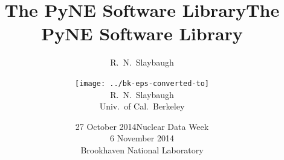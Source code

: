 \documentclass[xcolor=x11names,compress]{beamer}
\title{The PyNE Software Library}
\author{R.\ N.\ Slaybaugh}
\date{27 October 2014}
\renewcommand{\(}{\begin{columns}}
\renewcommand{\)}{\end{columns}}
\newcommand{\<}[1]{\begin{column}{#1}}
\renewcommand{\>}{\end{column}}
\begin{document}
\begin{frame}
\title{The PyNE Software Library}
\author{
        \texttt{[image: ../bk-eps-converted-to]}\\R.\ N.\ Slaybaugh \\ Univ.\ of Cal.\ Berkeley}

\date{Nuclear Data Week\\ 6 November 2014\\ Brookhaven National Laboratory}
\titlepage
\end{frame}

%
%        
%

\end{document}
